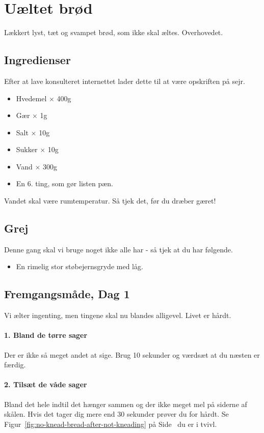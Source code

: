 \section{Uæltet brød}
Lækkert lyst, tæt og svampet brød, som ikke skal æltes. Overhovedet.

\subsection{Ingredienser}
Efter at lave konsulteret internettet lader dette til at være opskriften på sejr.

\begin{multicols}{2}
	\begin{itemize}
		\item Hvedemel $\times$ 400g
		\item Gær $\times$ 1g
		\item Salt $\times$ 10g
		\item Sukker $\times$ 10g
		\item Vand $\times$ 300g
		\item En 6. ting, som gør listen pæn.
	\end{itemize}
\end{multicols}

Vandet skal være rumtemperatur. Så tjek det, før du dræber gæret!

\subsection{Grej}
Denne gang skal vi bruge noget ikke alle har - så tjek at du har følgende.

\begin{itemize}
	\item En rimelig stor støbejernsgryde med låg.
\end{itemize}

\subsection{Fremgangsmåde, Dag 1}
Vi ælter ingenting, men tingene skal nu blandes alligevel. Livet er hårdt.

\paragraph*{1. Bland de tørre sager}
Der er ikke så meget andet at sige. Brug 10 sekunder og værdsæt at du næsten er færdig.

\paragraph*{2. Tilsæt de våde sager}
Bland det hele indtil det hænger sammen og der ikke meget mel på siderne af skålen. Hvis det tager dig mere end 30 sekunder prøver du for hårdt. Se Figur~\ref{fig:no-knead-bread-after-not-kneading} på Side~\pageref{fig:no-knead-bread-after-not-kneading} du er i tvivl.

